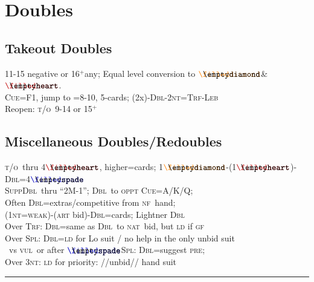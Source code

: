 \documentclass{article}
\newcommand\coloredsuitsymbol[3]{\ensuremath{\mathrel{\raisebox{-0.3pt}{{\color{#1}#2}\llap{#3}}}}}
\newcommand\suitsymbol[3]{\coloredsuitsymbol{#1}{#2}{#3}}%
\newcommand\D{\suitsymbol{diamondcolor}{\filleddiamond}{\emptydiamond}}
\renewcommand\H{\suitsymbol{heartcolor}{\filledheart}{\emptyheart}}
\renewcommand\S{\suitsymbol{spadecolor}{\filledspade}{\emptyspade}}
\newcommand\N{\caps{nt}}
\newcommand\X{\caps{Dbl}}
\newcommand\caps[1]{{\scshape#1}}
\newcommand\GF{\caps{gf}}
\newcommand\NF{\caps{nf}}
\newcommand\VUL{\caps{vul}}
\newcommand\NV{\caps{nv}}
\newcommand\TRF{\caps{Trf}}
\newcommand\NAT{\caps{nat}}
\newcommand\takeout{\caps{t/o}}
\newcommand\CUE{\caps{Cue}}
\newcommand\more{\ensuremath{^+}}
\newcommand{\smallsection}[1]{\vspace{-1ex}\subsection*{#1}\raggedright}
\newcommand{\thinrule}{\rule{\textwidth}{\arrayrulewidth}}
\newcommand{\myendrule}{\vspace{-1.5ex}\thinrule}
\begin{document}
\begin{minipage}[t]{96mm}
\section*{Doubles}
\smallsection{Takeout Doubles} 
	11-15 negative or 16\more any; Equal level conversion to \D \& \H.\\
	\CUE=F1, jump to =8-10, 5-cards; (2x)-\X-2\N=\caps{Trf-Leb}\\
	Reopen: \takeout\ 9-14 or 15\more
\smallsection{Miscellaneous Doubles/Redoubles}
	\takeout\ thru 4\H, higher=cards; 1\D-(1\H)-\X=4\S\\
	\caps{Supp}\X\ thru ``2M-1''; \X\ to \caps{oppt} \CUE=A/K/Q;\\ 
	Often \X=extras/competitive from \NF\ hand;\\
	(1\N=\caps{weak})-(\caps{art} bid)-\X=cards;  Lightner \X\\
	Over \TRF: \X=same as \X\ to \NAT\ bid, but \caps{ld} if \GF\\
	Over \caps{Spl}: \X=\caps{ld} for Lo suit / no help in the only unbid suit\\
	\quad \NV\ vs \VUL\ or after \S\caps{Spl}: \X=suggest \caps{pre}; \\
	Over 3\N: \caps{ld} for  priority: //unbid// hand suit\\
\myendrule
\end{minipage}
\hfill
\end{document}
